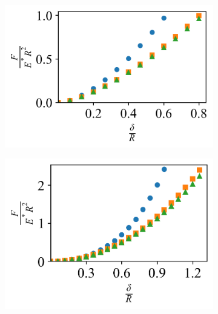 \begin{figure}[H]
    \hfill
    
    \begin{subfigure}[t]{0.32\textwidth}
        \centering
        \caption{\label{fig: Sphere-Plane-Force_Curve} }
        \includegraphics[width=1\linewidth]{Figures/Sphere-Plane-Force_Curve-Indenter.png}
    \end{subfigure}
    \hfill
    \begin{subfigure}[t]{0.32\textwidth}
        \centering
        \caption{\label{fig: Cone-Plane-Force_Curve} }
        \includegraphics[width=1\linewidth]{Figures/Cone-Plane-Force_Curve-Indenter.png}
    \end{subfigure}
    \hfill
    \begin{subfigure}[t]{0.32\textwidth}
        \centering
        \caption{\label{fig: Capped-Plane-Force_Curve}}

\end{subfigure}
\end{figure}
